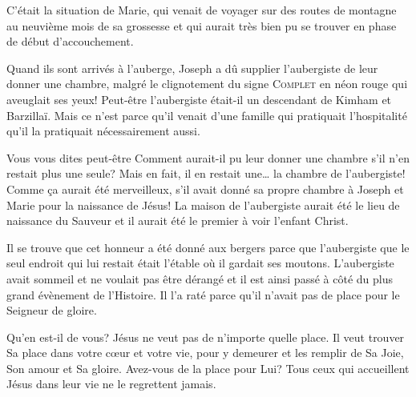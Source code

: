 C'était la situation de Marie, qui venait de voyager sur des routes de montagne au neuvième mois de sa grossesse et qui aurait très bien pu se trouver en phase de début d'accouchement.

Quand ils sont arrivés à l'auberge, Joseph a dû supplier l'aubergiste de leur donner une chambre, malgré le clignotement du signe \textsc{Complet} en néon rouge qui aveuglait ses yeux! Peut-être l'aubergiste était-il un descendant de Kimham et Barzillaï. Mais ce n'est parce qu'il venait d'une famille qui pratiquait l'hospitalité qu'il la pratiquait nécessairement aussi.

Vous vous dites peut-être\frcolon{} \og Comment aurait-il pu leur donner une chambre s'il n'en restait plus une seule? \fg{} Mais en fait, il en restait une… la chambre de l'aubergiste! Comme ça aurait été merveilleux, s'il avait donné sa propre chambre à Joseph et Marie pour la naissance de Jésus! La maison de l'aubergiste aurait été le lieu de naissance du Sauveur et il aurait été le premier à voir l'enfant Christ.

Il se trouve que cet honneur a été donné aux bergers parce que l'aubergiste que le seul endroit qui lui restait était l'étable où il gardait ses moutons. L'aubergiste avait sommeil et ne voulait pas être dérangé et il est ainsi passé à côté du plus grand évènement de l'Histoire. Il l'a raté parce qu'il n'avait pas de place pour le Seigneur de gloire.

Qu'en est-il de vous? Jésus ne veut pas de n'importe quelle place. Il veut trouver Sa place dans votre cœur et votre vie, pour y demeurer et les remplir de Sa Joie, Son amour et Sa gloire. Avez-vous de la place pour Lui? Tous ceux qui accueillent Jésus dans leur vie ne le regrettent jamais.



\ornrule


